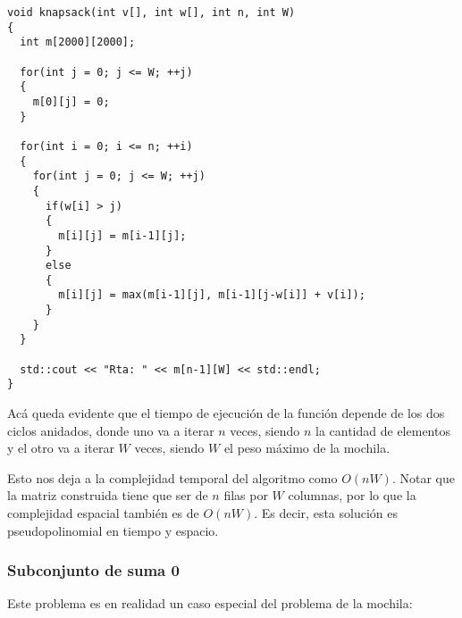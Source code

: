 \begin{center}
\begin{minipage}{1.02\textwidth}
\begin{lstlisting}[frame=lrtb]
void knapsack(int v[], int w[], int n, int W)
{
  int m[2000][2000];
  
  for(int j = 0; j <= W; ++j)
  {
    m[0][j] = 0;
  }

  for(int i = 0; i <= n; ++i)
  {
    for(int j = 0; j <= W; ++j)
    {
      if(w[i] > j)
      {
        m[i][j] = m[i-1][j];
      }
      else
      {
        m[i][j] = max(m[i-1][j], m[i-1][j-w[i]] + v[i]);
      }
    }
  }

  std::cout << "Rta: " << m[n-1][W] << std::endl;
}
\end{lstlisting}
\end{minipage}
\end{center}

Ac\'a queda evidente que el tiempo de ejecuci\'on de la funci\'on depende de los dos ciclos anidados, donde uno va a iterar $n$ veces, siendo $n$ la cantidad de elementos y el otro va a iterar $W$ veces, siendo $W$ el peso m\'aximo de la mochila.

Esto nos deja a la complejidad temporal del algoritmo como $O(nW)$. Notar que la matriz construida tiene que ser de $n$ filas por $W$ columnas, por lo que la complejidad espacial tambi\'en es de $O(nW)$. Es decir, esta soluci\'on es pseudopolinomial en tiempo y espacio.

\newpage
\subsubsection{Subconjunto de suma 0}

Este problema es en realidad un caso especial del problema de la mochila:

\noindent{}
